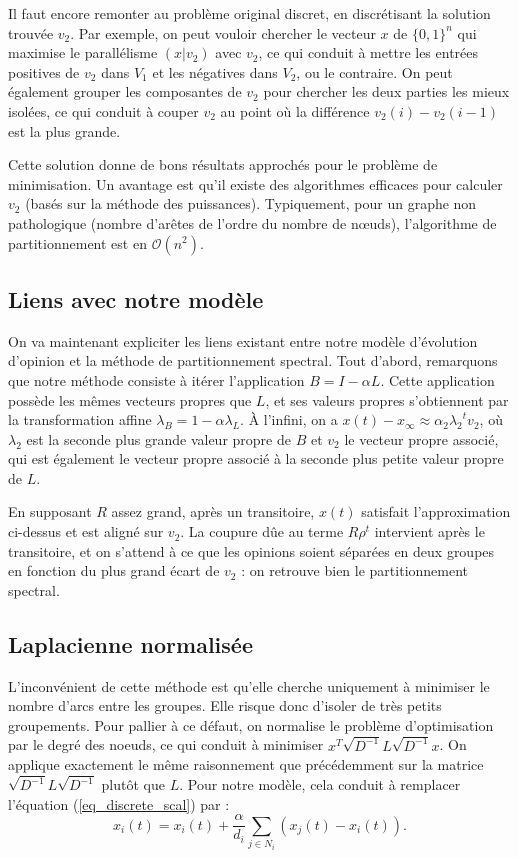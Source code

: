 \documentclass[12pt]{article}
\begin{document}
Il faut encore remonter au problème original discret, en
discrétisant la solution trouvée $v_2$. Par exemple, on peut vouloir
chercher le vecteur $x$ de $\{0,1\}^n$ qui maximise le parallélisme
$(x|v_2)$ avec $v_2$, ce qui conduit à mettre les entrées positives de
$v_2$ dans $V_1$ et les négatives dans $V_2$, ou le contraire. On peut
également grouper les composantes de $v_2$ pour chercher les deux
parties les mieux isolées, ce qui conduit à couper $v_2$ au point où
la différence $v_2(i) - v_2(i-1)$ est la plus grande.

Cette solution donne de bons résultats approchés pour le problème de
minimisation. Un avantage est qu'il existe des algorithmes efficaces
pour calculer $v_2$ (basés sur la méthode des
puissances). Typiquement, pour un graphe non pathologique (nombre
d'arêtes de l'ordre du nombre de n\oe uds), l'algorithme de
partitionnement est en $\mathcal O(n^2)$.

\subsection{Liens avec notre modèle}
On va maintenant expliciter les liens existant entre notre modèle
d'évolution d'opinion et la méthode de partitionnement spectral. Tout
d'abord, remarquons que notre méthode consiste à itérer l'application
$B = I - \alpha L$. Cette application possède les mêmes vecteurs
propres que $L$, et ses valeurs propres s'obtiennent par la
transformation affine $\lambda_B = 1 - \alpha \lambda_L$. À l'infini,
on a $x(t) - x_\infty \approx \alpha_2 {\lambda_2}^t v_2$, où
$\lambda_2$ est la seconde plus grande valeur propre de $B$ et $v_2$
le vecteur propre associé, qui est également le vecteur propre associé
à la seconde plus petite valeur propre de $L$.

En supposant $R$ assez grand, après un transitoire, $x(t)$ satisfait
l'approximation ci-dessus et est aligné sur $v_2$. La coupure dûe au
terme $R \rho^t$ intervient après le transitoire, et on s'attend à ce
que les opinions soient séparées en deux groupes en fonction du plus
grand écart de $v_2$ : on retrouve bien le partitionnement spectral.

\subsection{Laplacienne normalisée}
L'inconvénient de cette méthode est qu'elle cherche uniquement à
minimiser le nombre d'arcs entre les groupes. Elle risque donc
d'isoler de très petits groupements. Pour pallier à ce défaut, on
normalise le problème d'optimisation par le degré des noeuds, ce qui
conduit à minimiser $x^T \sqrt{D^{-1}} L \sqrt{D^{-1}} x$. On applique
exactement le même raisonnement que précédemment sur la matrice
$\sqrt{D^{-1}} L \sqrt{D^{-1}}$ plutôt que $L$. Pour notre modèle,
cela conduit à remplacer l'équation (\ref{eq_discrete_scal}) par :
\begin{equation}
 \label{eq_discrete_scal_renorm}
 x_i(t) = x_i(t) + \frac{\alpha}{d_i} \sum_{j \in N_i} (x_j(t) - x_i(t)).
\end{equation}
\end{document}
